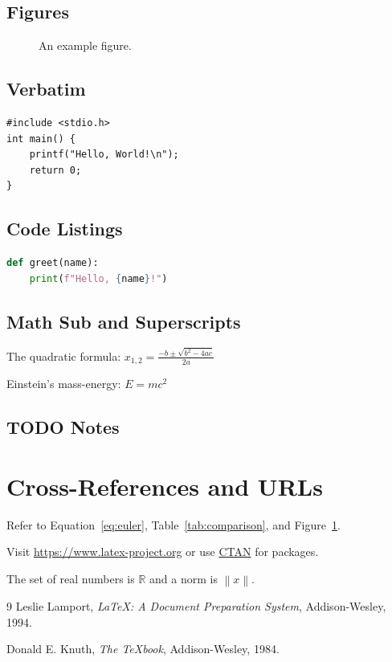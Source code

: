 \documentclass[12pt,a4paper]{article}
\begin{document}
\subsection{Figures}

\begin{figure}[ht]
  \centering
  \caption{An example figure.}
  \label{fig:example}
\end{figure}

\subsection{Verbatim}

\begin{verbatim}
#include <stdio.h>
int main() {
    printf("Hello, World!\n");
    return 0;
}
\end{verbatim}

\subsection{Code Listings}

\begin{lstlisting}[language=Python]
def greet(name):
    print(f"Hello, {name}!")
\end{lstlisting}

\subsection{Math Sub and Superscripts}

The quadratic formula: $x_{1,2} = \frac{-b \pm \sqrt{b^2 - 4ac}}{2a}$

Einstein's mass-energy: $E = mc^2$

\subsection{TODO Notes}


\section{Cross-References and URLs}
\label{sec:refs}

Refer to Equation~\ref{eq:euler}, Table~\ref{tab:comparison},
and Figure~\ref{fig:example}.

Visit \url{https://www.latex-project.org} or use
\href{https://ctan.org}{CTAN} for packages.

\newcommand{\R}{\mathbb{R}}
\newcommand{\norm}[1]{\left\|#1\right\|}

The set of real numbers is $\R$ and a norm is $\norm{x}$.


\begin{thebibliography}{9}
    Leslie Lamport,
    \textit{\LaTeX: A Document Preparation System},
    Addison-Wesley, 1994.

    Donald E. Knuth,
    \textit{The \TeX book},
    Addison-Wesley, 1984.
\end{thebibliography}
\end{document}
